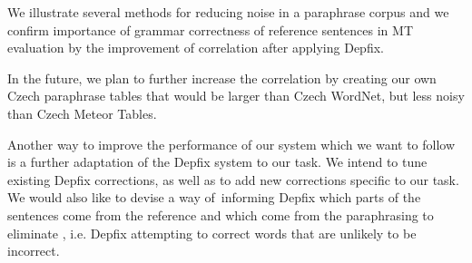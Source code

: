 We illustrate several methods for reducing noise in a paraphrase corpus and
we confirm importance of grammar correctness of reference sentences in MT 
evaluation by the improvement of correlation after applying Depfix.

In the future, we plan to further increase the correlation by creating our own 
Czech paraphrase tables that would be larger than Czech WordNet, but less noisy 
than Czech Meteor Tables.

Another way to improve the performance of our system which we want to follow
is a further adaptation of the Depfix system to our task. We intend to
tune existing Depfix corrections, as well as to add new corrections specific
to our task. We would also like to devise a way of~informing Depfix which parts
of the sentences come from the reference and which come from the paraphrasing
to eliminate , i.e. Depfix attempting to correct words
that are unlikely to be incorrect.